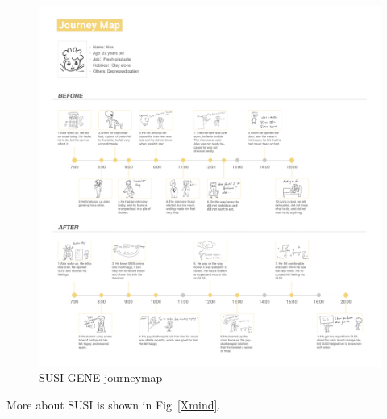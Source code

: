\documentclass[manuscript,screen]{acmart}
\begin{document}
\begin{figure}[h]
  \centering
  \includegraphics[width=\linewidth]{journeymap.jpg}
  \caption{SUSI GENE journeymap}
  \label{journeymap}
\end{figure}

More about SUSI is shown in Fig~\ref{Xmind}.
\end{document}

